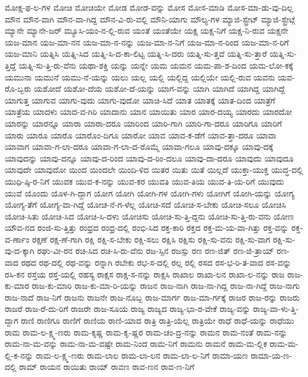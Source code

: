 {ಮೋಕ್ಷ-ಫ-ಲ-ಗಳ
ಮೋಚಿ
ಮೋಚಿಯೇ
ಮೋಡ
ಮೋಡ-ವನ್ನು
ಮೋಸ
ಮೋಸ-ಮಾಡಿ
ಮೋಸ-ಮಾ-ಡು-ವು-ದಿಲ್ಲ
ಮೌನ
ಮೌನ-ವಾಗಿ
ಮೌನ-ವಾ-ಗಿದ್ದ
ಮೌನ-ವಿ-ರು-ವಲ್ಲಿ
ಮೌನಿ-ಯಾಗು
ಮೌಲ್ಯ-ಗಳ
ಮ್ಯಾಜಿ-ಸ್ಟ್ರೇಟ್
ಮ್ಯಾಜಿ-ಸ್ಟ್ರೇಟ್ಗೆ
ಮ್ಯಾನೇ
ಮ್ಯಾನೇ-ಜರ್
ಮ್ಯೂಸಿ-ಯಂ-ನ-ಲ್ಲಿ-ರುವ
ಯಂತೆ
ಯಂತೆಯೇ
ಯಕ್ಷ
ಯಕ್ಷ-ನಿಗೆ
ಯಕ್ಷ-ನಿ-ರುವ
ಯಕ್ಷನೇ
ಯಜ-ಮಾನ
ಯಜ-ಮಾ-ನನ
ಯಜ-ಮಾ-ನ-ನನ್ನು
ಯಜ-ಮಾ-ನ-ನಿಗೆ
ಯಜ-ಮಾ-ನ-ರಿಂದ
ಯಜ-ಮಾ-ನ-ರಿಗೆ
ಯಜ-ಮಾನಿ
ಯತ್ನಿಸಿ
ಯತ್ನಿ-ಸಿದ
ಯತ್ನಿ-ಸಿ-ದ-ಕಾ-ಲಿಟ್ಟ
ಯತ್ನಿ-ಸಿ-ದರು
ಯತ್ನಿ-ಸು-ತ್ತವೆ
ಯತ್ನಿ-ಸು-ತ್ತಾರೆ
ಯತ್ನಿ-ಸು-ತ್ತಿದ್ದೆ
ಯತ್ನಿ-ಸು-ತ್ತಿ-ರು-ವೆನು
ಯಥಾ-ಶಕ್ತಿ
ಯನ್ನು
ಯನ್ನೇ
ಯಮ
ಯಮನ
ಯಮ-ಪಾ-ಶ-ದಿಂದ
ಯಮ-ಲೋ-ಕಕ್ಕೆ
ಯಮುನಾ
ಯಮುನೆ
ಯಮು-ನೆ-ಯನ್ನು
ಯಲು
ಯಲ್ಲ
ಯಲ್ಲಿ
ಯಲ್ಲಿದ್ದ
ಯಲ್ಲಿಯೇ
ಯಲ್ಲಿ-ರುವ
ಯವನು
ಯವ-ರೊ-ಬ್ಬರು
ಯಶೋದೆ
ಯಶೋ-ದೆಯ
ಯಶೋ-ದೆ-ಯನ್ನು
ಯಾಗ-ವನ್ನು
ಯಾಗಿ
ಯಾಗಿದೆ
ಯಾಗಿದ್ದ
ಯಾಗಿದ್ದೆ
ಯಾಗುತ್ತ
ಯಾಗುವ
ಯಾಗು-ವುದು
ಯಾಗು-ವುದೋ
ಯಾಚಿ-ಸಿದೆ
ಯಾತ
ಯಾತಕ್ಕೆ
ಯಾತ-ದಿಂದ
ಯಾತ್ರೆಗೆ
ಯಾತ್ರೆಯ
ಯಾದಳು
ಯಾದ-ವ-ಗಿರಿ
ಯಾದಾನು
ಯಾನ
ಯಾಯಿತು
ಯಾರ
ಯಾರ-ದಯ್ಯ
ಯಾರದು
ಯಾರದೋ
ಯಾರನ್ನು
ಯಾರನ್ನೂ
ಯಾರಾ
ಯಾರಾ-ದರೂ
ಯಾರಿಂದ
ಯಾರಿ-ಗಾಗಿ
ಯಾರಿ-ಗಾ-ದರೂ
ಯಾರಿಗೂ
ಯಾರಿಗೆ
ಯಾರು
ಯಾರೂ
ಯಾರೊ
ಯಾರೊಂ-ದಿಗೂ
ಯಾರೋ
ಯಾವ
ಯಾವ-ಕ-ಡೆಗೆ
ಯಾವ-ತ್ತಾ-ದರೂ
ಯಾವಾ
ಯಾವಾಗ
ಯಾವಾ-ಗ-ಲಾ-ದರೂ
ಯಾವಾ-ಗ-ಲಾ-ದ-ರೊಮ್ಮೆ
ಯಾವಾ-ಗಲೂ
ಯಾವು-ದಕ್ಕೂ
ಯಾವು-ದಕ್ಕೆ
ಯಾವುದನ್ನು
ಯಾವು-ದನ್ನೂ
ಯಾವು-ದ-ರಿಂದ
ಯಾವು-ದ-ರಿಂ-ದಲೂ
ಯಾವು-ದಾ-ದರೂ
ಯಾವುದು
ಯಾವುದೂ
ಯಾವುದೇ
ಯಾವುದೋ
ಯಿಂದ
ಯಿಂದಲೇ
ಯಿಂದಿ-ಳಿದ
ಯಿತರ
ಯಿತು
ಯಿತೆ
ಯಿಲ್ಲದೆ
ಯುಕ್ತಾ-ಯುಕ್ತ
ಯುದ್ಧ-ದಲ್ಲಿ
ಯುಧಿ-ಷ್ಠಿ-ರ-ನಿಗೆ
ಯುವಕ
ಯುವ-ಕ-ನನ್ನು
ಯುವ-ಕರ
ಯುವತಿ
ಯುವ-ತಿಯ
ಯುವ-ತಿ-ಯ-ರಿಗೆ
ಯುವುದು
ಯುವೆ
ಯೊಂದು
ಯೊಳ-ಗಿ-ದ್ದಾಗ
ಯೋಗ
ಯೋಗಿ
ಯೋಗಿ-ಗಳ
ಯೋಗಿ-ಗಳು
ಯೋಗಿಗೆ
ಯೋಗಿ-ಯನ್ನು
ಯೋಗ್ಯ
ಯೋಗ್ಯ-ತೆಗೆ
ಯೋಗ್ಯ-ವಾ-ಗಿದ್ದೆ
ಯೋಚ-ನೆ-ಗ-ಳೆಲ್ಲ
ಯೋಚಿ-ಸದೆ
ಯೋಚಿ-ಸ-ಬೇಕು
ಯೋಚಿ-ಸಲೂ
ಯೋಚಿಸಿ
ಯೋಚಿ-ಸಿತು
ಯೋಚಿ-ಸಿದ
ಯೋಚಿ-ಸಿ-ದಳು
ಯೋಚಿಸು
ಯೋಚಿ-ಸು-ತ್ತಿ-ದ್ದನು
ಯೋಚಿ-ಸು-ತ್ತಿ-ರು-ವನು
ಯೋಣ
ಯೌವ-ನದ
ರಂಜಿ-ಸು-ತ್ತಿತ್ತು
ರಂಧ್ರದ
ರಂಧ್ರ-ದಲ್ಲಿ
ರಂಭಿ-ಸಿದ
ರಕ್ತ-ಕಾರಿ
ರಕ್ತದ
ರಕ್ತ-ಮ-ಯ-ವಾ-ಗಿತ್ತು
ರಕ್ತ-ವನ್ನು
ರಕ್ತ-ವ-ರ್ಣಾಂ
ರಕ್ಷಣೆ
ರಕ್ಷ-ಣೆ-ಗಾಗಿ
ರಕ್ಷಿ
ರಕ್ಷಿ-ಸ-ಬೇಕು
ರಕ್ಷಿ-ಸಲು
ರಕ್ಷಿಸಿ
ರಕ್ಷಿಸು
ರಕ್ಷಿ-ಸು-ವನು
ರಕ್ಷಿ-ಸು-ವಾಗ
ರಕ್ಷಿ-ಸು-ವು-ದ-ಕ್ಕಾಗಿ
ರಘು-ವೀ-ರನ
ರಚಿ-ಸಿದ
ರಚಿ-ಸಿ-ರು-ವೆನು
ರಜ-ಸ್ಸಿನ
ರಜಸ್ಸು
ರಣ
ರಣ-ಜಿತ್
ರಣ-ಜಿ-ತ್ರಾಯ್
ರಣ-ವಾದ
ರಥದ
ರಥ-ದಲ್ಲಿ
ರಥ-ವನ್ನು
ರನ್ನಾಗಿ
ರಬೇಕು
ರಭ-ಸ-ದಲ್ಲಿ
ರಲ್ಲ
ರಲ್ಲಿ
ರಸದ
ರಸ-ಭ-ರಿ-ತ-ವಾದ
ರಸ-ವನ್ನು
ರಸಿ-ಕನ
ರಸ್ತೆಯ
ರಸ್ತೆ-ಯಲ್ಲಿ
ರಹಸ್ಯ
ರಾಕ್ಷಸ
ರಾಕ್ಷ-ಸ-ನನ್ನು
ರಾಕ್ಷಸಿ
ರಾಖಾಲ
ರಾಖಾ-ಲನ
ರಾಖಾ-ಲ-ನನ್ನು
ರಾಜ
ರಾಜ-ಕು-ಮಾರ
ರಾಜ-ಕು-ಮಾರಿ
ರಾಜ-ಕು-ಮಾ-ರಿ-ಯನ್ನು
ರಾಜನ
ರಾಜ-ನಾಗಿ
ರಾಜ-ನಾ-ಗಿದ್ದ
ರಾಜ-ನಾ-ಗಿದ್ದೆ
ರಾಜ-ನಾಗು
ರಾಜ-ನಾದೆ
ರಾಜ-ನಿಗೆ
ರಾಜನು
ರಾಜನೇ
ರಾಜ-ನೊಬ್ಬ
ರಾಜ-ಮಾರ್ಗ
ರಾಜ-ಮಾ-ರ್ಗಕ್ಕೆ
ರಾಜರ
ರಾಜ-ರನ್ನು
ರಾಜರು
ರಾಜರೆ
ರಾಜ-ರೆ-ದು-ರಿಗೆ
ರಾಜರೇ
ರಾಜ-ಸೂಯ
ರಾಜ್ಯ
ರಾಜ್ಯದ
ರಾಜ್ಯ-ಭಾ-ರ-ವೇಕೆ
ರಾಜ್ಯ-ವನ್ನು
ರಾಜ್ಯ-ವಾ-ಳು-ತ್ತಿ-ದ್ದಾಗ
ರಾಣಿ
ರಾಣಿಗೂ
ರಾಣಿಗೆ
ರಾಣಿಯ
ರಾಣಿ-ಯಾದ
ರಾತ್ರಿ
ರಾತ್ರಿ-ಯೆಲ್ಲ
ರಾತ್ರಿಯೇ
ರಾಧೆ
ರಾಧೆ-ಯನ್ನು
ರಾಧೆಯು
ರಾಮ
ರಾಮ-ಲ-ಕ್ಷ್ಮ-ಣರು
ರಾಮ-ಕೃಷ್ಣ
ರಾಮ-ಕೃ-ಷ್ಣರ
ರಾಮ-ಚಂ-ದ್ರ-ನನ್ನು
ರಾಮನ
ರಾಮ-ನಂತೆ
ರಾಮ-ನನ್ನು
ರಾಮ-ನಾ-ಮ-ವನ್ನು
ರಾಮ-ನಾ-ಮ-ವಷ್ಟೇ
ರಾಮ-ನಿಂದ
ರಾಮ-ನಿಗೆ
ರಾಮನು
ರಾಮನೆ
ರಾಮ-ಮ-ಲ್ಲಿಕ
ರಾಮ-ಮ-ಲ್ಲಿ-ಕ-ನನ್ನು
ರಾಮ-ಲ-ಕ್ಷ್ಮ-ಣರು
ರಾಮ-ಲಾಲ
ರಾಮ-ಲಾ-ಲನ
ರಾಮ-ಲಾ-ಲ-ನಿಗೆ
ರಾಮಾ-ಯಣ
ರಾಮಾ-ಯ-ಣ-ದಲ್ಲಿ
ರಾಮ್
ರಾಯನ
ರಾಯಿತು
ರಾಯ್
ರಾವಣ
ರಾವ-ಣನ
ರಾವ-ಣ-ನಿಗೆ
}
